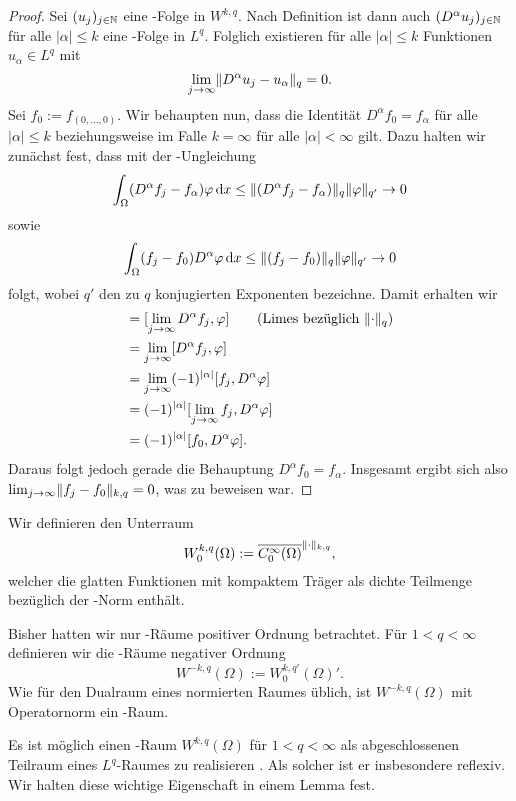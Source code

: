 \begin{proof}
  Sei $(u_j)_{j \in \mathbb{N}}$ eine \cauchy\hyp{}Folge in $W^{k,q}$.
  Nach Definition ist dann auch $(D^\alpha u_j)_{j \in \mathbb{N}}$ für alle $|\alpha| \leq k$ eine \cauchy\hyp{}Folge in $L^q$.
  Folglich existieren für alle $|\alpha| \leq k$ Funktionen $u_\alpha \in L^q$ mit 
  $$
  \lim_{j \to \infty} \lVert D^\alpha u_j - u_\alpha \rVert_q = 0.
  $$
  Sei $f_0 := f_{(0,\dots,0)}$.
  Wir behaupten nun, dass die Identität $D^\alpha f_0 = f_\alpha$ für alle $|\alpha| \leq k$ beziehungsweise im Falle $k = \infty$ für alle $|\alpha| < \infty$ gilt.
  Dazu halten wir zunächst fest, dass mit der \hoelder\hyp{}Ungleichung
  $$
  \int_\Omega (D^\alpha f_j - f_\alpha) \varphi \, {\operatorname{d}\!{x}}
  \leq \lVert (D^\alpha f_j - f_\alpha) \rVert_q \lVert \varphi \rVert_{q'} \to 0
  $$
  sowie
  $$
  \int_\Omega (f_j - f_0) D^\alpha \varphi \, {\operatorname{d}\!{x}}
  \leq \lVert (f_j - f_0) \rVert_q \lVert \varphi \rVert_{q'} \to 0
  $$
  folgt, wobei $q'$ den zu $q$ konjugierten Exponenten bezeichne.
  Damit erhalten wir
  \begin{align*}
    [f_\alpha, \varphi] 
    &= [\lim_{j \to \infty} D^\alpha f_j, \varphi] \tag{Limes bezüglich $\norm{\cdot}_q$} \\
    &= \lim_{j \to \infty} [D^\alpha f_j, \varphi] \\
    &= \lim_{j \to \infty} (-1)^{|\alpha|}[f_j, D^\alpha \varphi] \\
    &=  (-1)^{|\alpha|}[\lim_{j \to \infty} f_j, D^\alpha \varphi] \\
    &=  (-1)^{|\alpha|}[f_0, D^\alpha \varphi].
  \end{align*}
  Daraus folgt jedoch gerade die Behauptung $D^\alpha f_0 = f_\alpha$.
  Insgesamt ergibt sich also $\lim_{j \to \infty} \lVert f_j - f_0 \rVert_{k,q} =  0$, was zu beweisen war.
\end{proof}

Wir definieren den Unterraum
$$
  W_0^{k,q}(\Omega) := \overline{C_0^\infty(\Omega)}^{\lVert \cdot \rVert_{k,q}},
$$
welcher die glatten Funktionen mit kompaktem Träger als dichte Teilmenge bezüglich der \sobolev\hyp{}Norm enthält.

Bisher hatten wir nur \sobolev\hyp{}Räume positiver Ordnung betrachtet.
Für $1 < q < \infty$ definieren wir die \sobolev\hyp{}Räume negativer Ordnung 
$$
  W^{-k,q}(\Omega) := W_0^{k,q'}(\Omega)'.
$$
Wie für den Dualraum eines normierten Raumes üblich, ist $W^{-k,q}(\Omega)$ mit Operatornorm ein \banach\hyp{}Raum.

Es ist möglich einen \sobolev\hyp{}Raum $W^{k,q}(\Omega)$ für $1 < q < \infty$ als abgeschlossenen Teilraum eines $L^q$\hyp{}Raumes zu realisieren \cite[S.61, 3.5]{adams2003sobolev}.
Als solcher ist er insbesondere reflexiv.
Wir halten diese wichtige Eigenschaft in einem Lemma fest.

